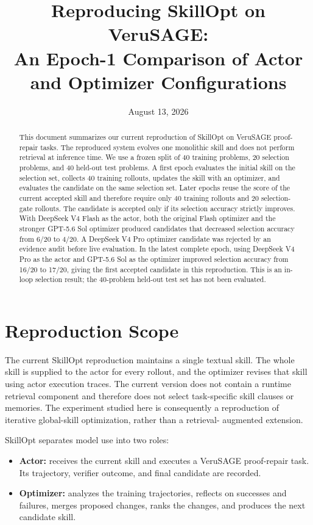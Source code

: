 \documentclass[11pt]{article}
\title{Reproducing SkillOpt on VeruSAGE:\\
An Epoch-1 Comparison of Actor and Optimizer Configurations}
\author{}
\date{August 13, 2026}
\newcommand{\dflash}{DeepSeek V4 Flash}
\newcommand{\dpro}{DeepSeek V4 Pro}
\newcommand{\sol}{GPT-5.6 Sol}
\begin{document}
\maketitle

\begin{abstract}
This document summarizes our current reproduction of SkillOpt on VeruSAGE
proof-repair tasks. The reproduced system evolves one monolithic skill and
does not perform retrieval at inference time. We use a frozen split of 40
training problems, 20 selection problems, and 40 held-out test problems. A
first epoch evaluates the initial skill on the selection set, collects 40
training rollouts, updates the skill with an optimizer, and evaluates the
candidate on the same selection set. Later epochs reuse the score of the
current accepted skill and therefore require only 40 training rollouts and 20
selection-gate rollouts. The candidate is accepted only if its selection
accuracy strictly improves. With \dflash{} as the actor, both the
original Flash optimizer and the stronger \sol{} optimizer produced candidates
that decreased selection accuracy from 6/20 to 4/20. A \dpro{} optimizer
candidate was rejected by an evidence audit before live evaluation. In the
latest complete epoch, using \dpro{} as the actor and \sol{} as the optimizer
improved selection accuracy from 16/20 to 17/20, giving the first accepted
candidate in this reproduction. This is an in-loop selection result; the
40-problem held-out test set has not been evaluated.
\end{abstract}

\section{Reproduction Scope}

The current SkillOpt reproduction maintains a single textual skill. The whole
skill is supplied to the actor for every rollout, and the optimizer revises
that skill using actor execution traces. The current version does not contain
a runtime retrieval component and therefore does not select task-specific
skill clauses or memories. The experiment studied here is consequently a
reproduction of iterative global-skill optimization, rather than a retrieval-
augmented extension.

SkillOpt separates model use into two roles:

\begin{itemize}
    \item \textbf{Actor:} receives the current skill and executes a VeruSAGE
    proof-repair task. Its trajectory, verifier outcome, and final candidate
    are recorded.
    \item \textbf{Optimizer:} analyzes the training trajectories, reflects on
    successes and failures, merges proposed changes, ranks the changes, and
    produces the next candidate skill.
\end{itemize}
\end{document}
